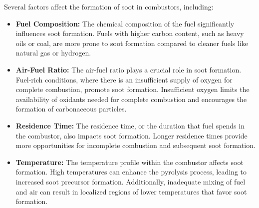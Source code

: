 Several factors affect the formation of soot in combustors, including:
\begin{itemize}
    \item \textbf{Fuel Composition:} The chemical composition of the fuel significantly influences soot formation. Fuels with higher carbon content, such as heavy oils or coal, are more prone to soot formation compared to cleaner fuels like natural gas or hydrogen.
    \item \textbf{Air-Fuel Ratio:} The air-fuel ratio plays a crucial role in soot formation. Fuel-rich conditions, where there is an insufficient supply of oxygen for complete combustion, promote soot formation. Insufficient oxygen limits the availability of oxidants needed for complete combustion and encourages the formation of carbonaceous particles.
    \item \textbf{Residence Time:} The residence time, or the duration that fuel spends in the combustor, also impacts soot formation. Longer residence times provide more opportunities for incomplete combustion and subsequent soot formation.
    \item \textbf{Temperature:} The temperature profile within the combustor affects soot formation. High temperatures can enhance the pyrolysis process, leading to increased soot precursor formation. Additionally, inadequate mixing of fuel and air can result in localized regions of lower temperatures that favor soot formation.
\end{itemize}

